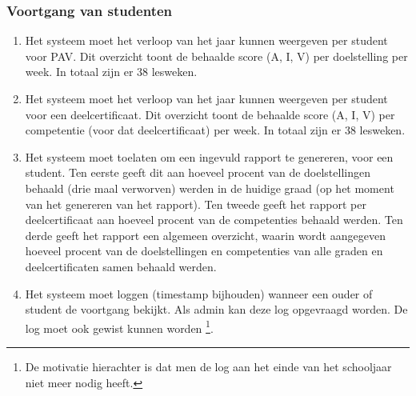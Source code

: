 \documentclass[a4paper]{article}
\begin{document}
\subsubsection{Voortgang van studenten}
\begin{enumerate}[label=F\arabic*,resume]
\item Het systeem moet het verloop van het jaar kunnen weergeven per student voor PAV. Dit overzicht toont de behaalde score (A, I, V) per doelstelling per week. In totaal zijn er $38$ lesweken.
\item Het systeem moet het verloop van het jaar kunnen weergeven per student voor een deelcertificaat. Dit overzicht toont de behaalde score (A, I, V) per competentie (voor dat deelcertificaat) per week. In totaal zijn er $38$ lesweken.
\item Het systeem moet toelaten om een ingevuld rapport te genereren, voor een student. Ten eerste geeft dit aan hoeveel procent van de doelstellingen behaald (drie maal verworven) werden in de huidige graad (op het moment van het genereren van het rapport). Ten tweede geeft het rapport per deelcertificaat aan hoeveel procent van de competenties behaald werden. Ten derde geeft het rapport een algemeen overzicht, waarin wordt aangegeven hoeveel procent van de doelstellingen en competenties van alle graden en deelcertificaten samen behaald werden.
\item Het systeem moet loggen (timestamp bijhouden) wanneer een ouder of student de voortgang bekijkt. Als admin kan deze log opgevraagd worden. De log moet ook gewist kunnen worden \footnote{De motivatie hierachter is dat men de log aan het einde van het schooljaar niet meer nodig heeft.}.
\end{enumerate}
\end{document}
